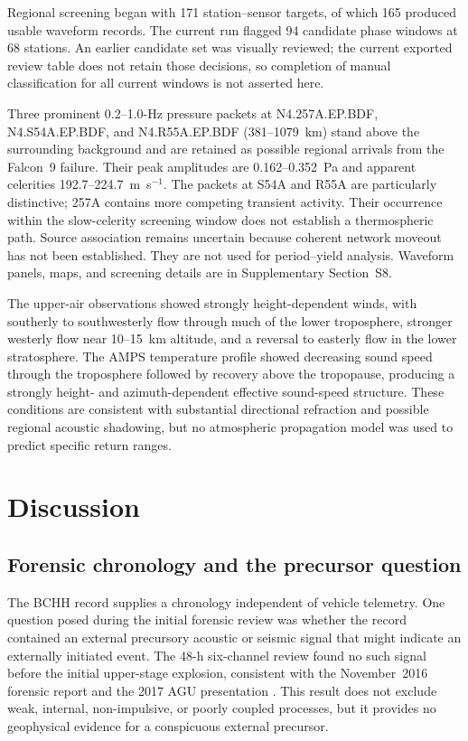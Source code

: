\documentclass[]{seismica}
\begin{document}
Regional screening began with 171 station--sensor targets, of which 165
produced usable waveform records. The current run flagged 94 candidate phase
windows at 68 stations. An earlier candidate set was visually reviewed; the
current exported review table does not retain those decisions, so completion
of manual classification for all current windows is not asserted here.

Three prominent 0.2--1.0-Hz pressure packets at N4.257A.EP.BDF,
N4.S54A.EP.BDF, and N4.R55A.EP.BDF (381--1079~km) stand above the surrounding
background and are retained as possible regional arrivals from the Falcon~9
failure. Their peak amplitudes are 0.162--0.352~Pa and apparent celerities
192.7--224.7~m~s$^{-1}$. The packets at S54A and R55A are particularly
distinctive; 257A contains more competing transient activity. Their occurrence
within the slow-celerity screening window does not establish a thermospheric
path. Source association remains uncertain because coherent network moveout
has not been established. They are not used for period--yield analysis.
Waveform panels, maps, and screening details are in Supplementary Section~S8.

The upper-air observations showed strongly height-dependent winds, with
southerly to southwesterly flow through much of the lower troposphere, stronger
westerly flow near 10--15~km altitude, and a reversal to easterly flow in the
lower stratosphere. The AMPS temperature profile showed decreasing sound speed
through the troposphere followed by recovery above the tropopause, producing a
strongly height- and azimuth-dependent effective sound-speed structure. These
conditions are consistent with substantial directional refraction and possible
regional acoustic shadowing, but no atmospheric propagation model was used to
predict specific return ranges.


\section{Discussion}
\label{sec:discussion}

\subsection{Forensic chronology and the precursor question}

The BCHH record supplies a chronology independent of vehicle telemetry. One
question posed during the initial forensic review was whether the record
contained an external precursory acoustic or seismic signal that might indicate
an externally initiated event. The 48-h six-channel review found no such signal
before the initial upper-stage explosion, consistent with the November~2016
forensic report \citep{thompson_mcnutt_fireball_2016} and the 2017 AGU
presentation \citep{thompson_agu_falcon9_2017}. This result does not exclude
weak, internal, non-impulsive, or poorly coupled processes, but it provides no
geophysical evidence for a conspicuous external precursor.
\end{document}
